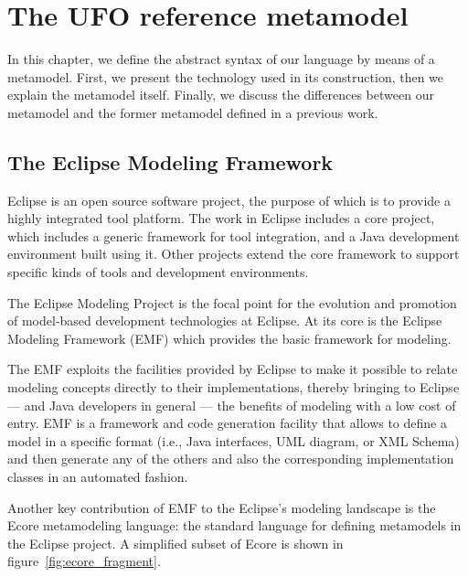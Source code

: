 \documentclass[
	10pt,				%
	oneside,
	a4paper,			%
	brazil,
	english
	]{abntex2}
\begin{document}
%

\chapter{The UFO reference metamodel}

In this chapter, we define the abstract syntax of our language by means of a
metamodel. First, we present the technology used in its construction, then we
explain the metamodel itself. Finally, we discuss the differences between our
metamodel and the former metamodel defined in a previous work.


\section{The Eclipse Modeling Framework}

Eclipse is an open source software project, the purpose of which is to provide
a highly integrated tool platform. The work in Eclipse includes a core project,
which includes a generic framework for tool integration, and a Java development
environment built using it. Other projects extend the core framework to support
specific kinds of tools and development environments.

The Eclipse Modeling Project is the focal point for the evolution and promotion
of model-based development technologies at Eclipse. At its core is the Eclipse
Modeling Framework (EMF) \cite{budinsky09} which provides the basic framework for modeling.

The EMF exploits the facilities provided by Eclipse to make it possible to relate
modeling concepts directly to their implementations, thereby bringing to Eclipse
— and Java developers in general — the benefits of modeling with a low cost of entry.
%
EMF is a framework and code generation facility that allows to define a model in
a specific format (i.e., Java interfaces, UML diagram, or XML Schema) and then
generate any of the others and also the corresponding implementation classes in
an automated fashion.

Another key contribution of EMF to the Eclipse's modeling landscape is the Ecore
metamodeling language: the standard language for defining metamodels in
the Eclipse project. A simplified subset of Ecore is shown in figure~\ref{fig:ecore_fragment}.
\end{document}
